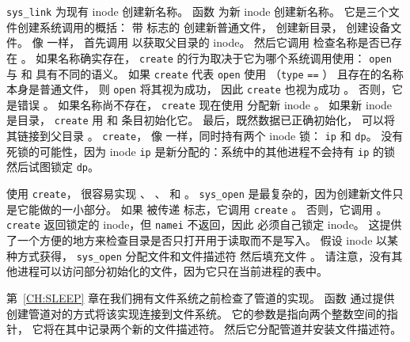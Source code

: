 \lstinline{sys_link}
为现有 inode 创建新名称。
函数
为新 inode 创建新名称。
它是三个文件创建系统调用的概括：
带
标志的
创建新普通文件，
创建新目录，
创建设备文件。
像
一样，
首先调用
以获取父目录的 inode。
然后它调用
检查名称是否已存在
。
如果名称确实存在，
\lstinline{create}
的行为取决于它为哪个系统调用使用：
\lstinline{open}
与
和
具有不同的语义。
如果
\lstinline{create}
代表
\lstinline{open}
使用
（\lstinline{type}
\lstinline{==}
）
且存在的名称本身是普通文件，
则
\lstinline{open}
将其视为成功，
因此
\lstinline{create}
也视为成功
。
否则，它是错误
。
如果名称尚不存在，
\lstinline{create}
现在使用
分配新 inode
。
如果新 inode 是目录，
\lstinline{create}
用
和
条目初始化它。
最后，既然数据已正确初始化，
可以将其链接到父目录
。
\lstinline{create}，
像
一样，同时持有两个 inode 锁：
\lstinline{ip}
和
\lstinline{dp}。
没有死锁的可能性，因为 inode
\lstinline{ip}
是新分配的：系统中的其他进程不会持有
\lstinline{ip}
的锁然后试图锁定
\lstinline{dp}。

使用
\lstinline{create}，
很容易实现
、
、
和
。
\lstinline{sys_open}
是最复杂的，因为创建新文件只是它能做的一小部分。
如果
被传递
标志，它调用
\lstinline{create}
。
否则，它调用
。
\lstinline{create}
返回锁定的 inode，但
\lstinline{namei}
不返回，因此
必须自己锁定 inode。
这提供了一个方便的地方来检查目录是否只打开用于读取而不是写入。
假设 inode 以某种方式获得，
\lstinline{sys_open}
分配文件和文件描述符
然后填充文件
。
请注意，没有其他进程可以访问部分初始化的文件，因为它只在当前进程的表中。

第~\ref{CH:SLEEP} 章在我们拥有文件系统之前检查了管道的实现。
函数
通过提供创建管道对的方式将该实现连接到文件系统。
它的参数是指向两个整数空间的指针，
它将在其中记录两个新的文件描述符。
然后它分配管道并安装文件描述符。
